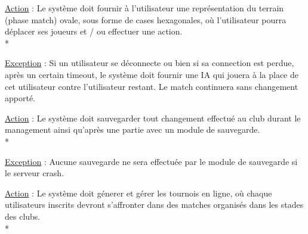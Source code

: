 \documentclass[a4paper]{article}
\begin{document}
\begin{description}[style=nextline]
			\item[Représentation phase match :]
			\begin{description}[leftmargin=*] %
				\item[]
				\item \underline{Action} : Le système doit fournir à l'utilisateur une représentation du terrain (phase match) ovale, sous forme de cases hexagonales, où l'utilisateur pourra déplacer ses joueurs et / ou effectuer une action.\\*
				\item \underline{Exception} : Si un utilisateur se déconnecte ou bien si sa connection est perdue, après un certain timeout, le système doit fournir une IA qui jouera à la place de cet utilisateur contre l'utilisateur restant. Le match continuera sans changement apporté.
			\end{description} %
			
			\item[Sauvegarde :]
			\begin{description}[leftmargin=*] %
				\item[]
				\item \underline{Action} : Le système doit sauvegarder tout changement effectué au \gls{club} durant le management ainsi qu'après une partie avec un module de sauvegarde.\\*
				\item \underline{Exception} : Aucune sauvegarde ne sera effectuée par le module de sauvegarde si le serveur crash.
			\end{description} %
			
			\item[Tournois :]
			\begin{description}[leftmargin=*] %
				\item[]
				\item \underline{Action} : Le système doit génerer et gérer les tournois en ligne, où chaque utilisateurs inscrits devront s'affronter dans des matches organisés dans les stades des clubs.\\*
			\end{description} %
			
		\end{description}
\end{document}
